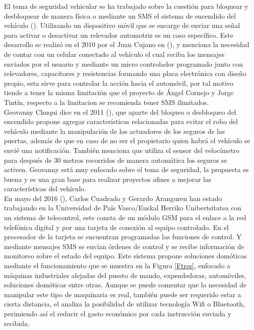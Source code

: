 El tema de seguridad vehicular se ha trabajado sobre la cuestión para bloquear y desbloquear de manera física o mediante un SMS el sistema de encendido del vehículo (\cite{UPS-03,UPS-04,UPS-09}). Utilizando un dispositivo móvil que se encarge de enviar una señal para activar o desactivar un relevador automotriz es un caso específico. Este desarrollo se realizó en el 2010 por el Juan Cujano en (\cite{UPS-03}), y menciona la necesidad de contar con un celular conectado al vehículo el cual reciba los mensajes enviados por el usuario y mediante un micro controlador programado junto con relevadores, capacitores y resistencias formando una placa electrónica con diseño propio, esta sirve para controlar la acción hacia el automóvil, por tal motivo tiende a tener la misma limitación que el proyecto de Ángel Cornejo y Jorge Tintín, respecto a la limitacion  se recomienda tener SMS ilimitados.\\

Geovanny Chuqui dice en el 2011 (\cite{UPS-04}), que aparte del bloqueo o desbloqueo del encendido propone agregar características relacionadas para evitar el robo del vehículo mediante la manipulación de los actuadores de los seguros de las puertas, además de que en caso de no ser el propietario quien habrá el vehículo se envié una notificación. También menciona que utiliza el sensor del velocímetro para después de 30 metros recorridos de manera automática los seguros se activen. Geovanny está muy enfocado sobre el tema de seguridad, la propuesta es buena y es una gran base para realizar proyectos afines a mejorar las características del vehículo.\\

En mayo del 2016 (\cite{UPS-05}), Carlos Cuadrado y Gerardo Aranguren han estado trabajando en la Universidad de País Vasco/Euskal Herriko Unibertsitatea con un sistema de telecontrol, este consta de un módulo GSM para el enlace a la red telefónica digital y por una tarjeta de conexión al equipo controlado. En el procesador de la tarjeta se encuentran programadas las funciones de control. Y mediante mensajes SMS se envían órdenes de control y se recibe información de monitoreo sobre el estado del equipo. Este sistema propone soluciones domóticas mediante el funcionamiento que se muestra en la Figura \ref{Ftres}, enfocado a máquinas industriales alejadas del puesto de mando, expendedoras, automóviles, soluciones domóticas entre otras. Aunque se puede comentar que la necesidad de manipular este tipo de maquinaria es real, también puede ser requerido estar a cierta distancia, el analiza la posibilidad de utilizar tecnología Wifi o Bluetooth, perimiendo así el reducir el gasto económico por cada instrucción enviada y recibida.\\

